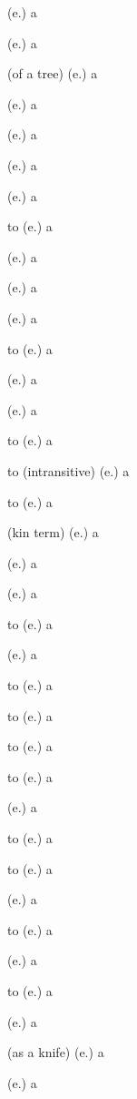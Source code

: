 \begin{glosses}
\par {} (e.) {a}
\par {} (e.) {a}
\par {} (of a tree) (e.) {a}
\par {} (e.) {a}
\par {} (e.) {a}
\par {} (e.) {a}
\par {} (e.) {a}
\par to  (e.) {a}
\par {} (e.) {a}
\par {} (e.) {a}
\par {} (e.) {a}
\par to  (e.) {a}
\par {} (e.) {a}
\par {} (e.) {a}
\par to  (e.) {a}
\par to  (intransitive) (e.) {a}
\end{glosses}

\begin{glosses}
\par to  (e.) {a}
\par {} (kin term) (e.) {a}
\par {} (e.) {a}
\par {} (e.) {a}
\par to  (e.) {a}
\par {} (e.) {a}
\par to  (e.) {a}
\par to  (e.) {a}
\par to  (e.) {a}
\par to  (e.) {a}
\end{glosses}

\begin{glosses}
\par {} (e.) {a}
\par to  (e.) {a}
\par to  (e.) {a}
\par {} (e.) {a}
\par to  (e.) {a}
\par {} (e.) {a}
\par to  (e.) {a}
\par {} (e.) {a}
\par {} (as a knife) (e.) {a}
\par {} (e.) {a}
\end{glosses}

